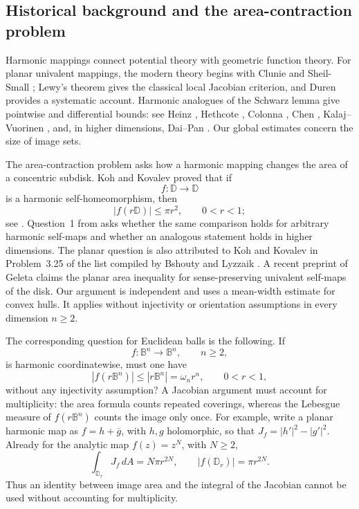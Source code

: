 \documentclass[11pt,reqno]{amsart}
\theoremstyle{remark}
\begin{document}
\subsection{Historical background and the area-contraction problem}

Harmonic mappings connect potential theory with geometric function theory.
For planar univalent mappings, the modern theory begins with Clunie and
Sheil-Small \cite{ClunieSheilSmall}; Lewy's theorem \cite{Lewy} gives the
classical local Jacobian criterion, and Duren \cite{Duren} provides a
systematic account.  Harmonic analogues of the Schwarz lemma give
pointwise and differential bounds: see Heinz \cite{Heinz}, Hethcote
\cite{Hethcote}, Colonna \cite{Colonna}, Chen \cite{Chen},
Kalaj--Vuorinen \cite{KalajVuorinen}, and, in higher dimensions,
Dai--Pan \cite{DaiPan2015,DaiPan}.  Our global estimates concern the
size of image sets.

The area-contraction problem asks how a harmonic mapping changes the
area of a concentric subdisk.  Koh and Kovalev proved that if
\[
 f:\mathbb D\to\mathbb D
\]
is a harmonic self-homeomorphism, then
\[
 |f(r\mathbb D)|\le \pi r^2,\qquad 0<r<1;
\]
see \cite{KohKovalev}.   Question~1 from \cite{KohKovalev}  asks whether the same comparison
holds for arbitrary harmonic self-maps and whether an analogous
statement holds in higher dimensions.
The planar question is also attributed to Koh and Kovalev in
Problem~3.25 of the list compiled by Bshouty and Lyzzaik
\cite{BshoutyLyzzaik}.  A recent preprint of Geleta \cite{Geleta}
claims the planar area inequality for sense-preserving univalent
self-maps of the disk.  Our argument is independent and uses a mean-width
estimate for convex hulls.  It applies without injectivity or orientation
assumptions in every dimension $n\ge2$.

The corresponding question for Euclidean balls is the following.  If
\[
 f:\mathbb B^n\longrightarrow\mathbb B^n,
 \qquad n\ge2,
\]
is harmonic coordinatewise, must one have
\begin{equation}\label{eq:intro-volume-question}
 |f(r\mathbb B^n)|
 \le
 |r\mathbb B^n|
 =
 \omega_n r^n,
 \qquad 0<r<1,
\end{equation}
without any injectivity assumption?  A Jacobian argument must account for multiplicity: the area formula
counts repeated coverings, whereas the Lebesgue measure of
$f(r\mathbb B^n)$ counts the image only once.  For example, write a planar harmonic map as $f=h+\overline g$, with
$h,g$ holomorphic, so that $J_f=|h'|^2-|g'|^2$.
Already for the analytic map $f(z)=z^N$, with $N\ge2$,
\[
 \int_{\mathbb D_r}J_f\,dA
 =
 N\pi r^{2N},
 \qquad
 |f(\mathbb D_r)|
 =
 \pi r^{2N}.
\]
Thus an identity between image area and the integral of the Jacobian
cannot be used without accounting for multiplicity.
\end{document}
